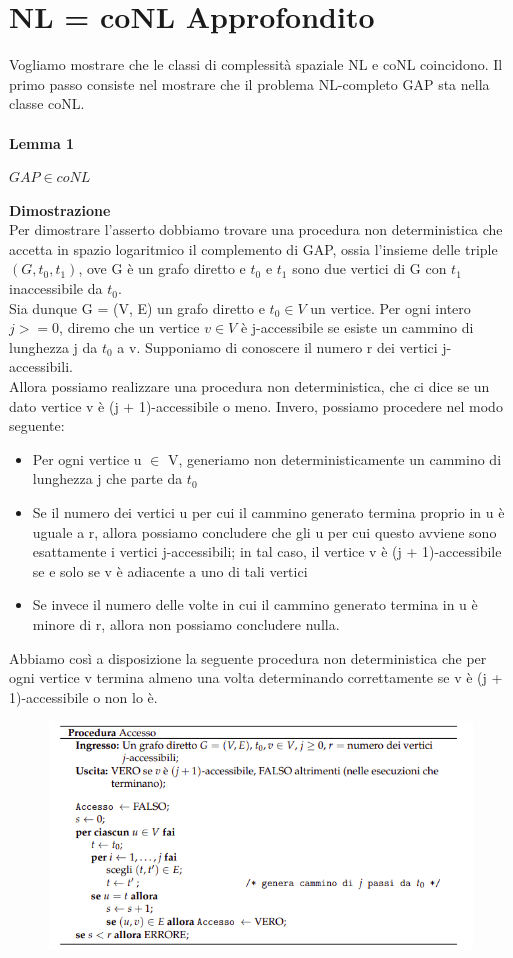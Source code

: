 \section{NL = coNL Approfondito}
Vogliamo mostrare che le classi di complessità spaziale NL e coNL coincidono. Il primo passo consiste nel mostrare che il problema NL-completo GAP sta nella classe coNL.\\\\
\textbf{Lemma 1}
\begin{center}
    $GAP \in coNL$
\end{center}
\textbf{Dimostrazione}\\
Per dimostrare l’asserto dobbiamo trovare una procedura non deterministica che accetta in spazio logaritmico il complemento di GAP, ossia l’insieme delle triple $(G, t_0, t_1)$, ove G è un grafo diretto e $t_0$ e $t_1$ sono due vertici di G con $t_1$ inaccessibile da $t_0$.
\\Sia dunque G = (V, E) un grafo diretto e $t_0 \in V$ un vertice. Per ogni intero $j >= 0$, diremo che un vertice $v \in V$ è j-accessibile se esiste un cammino di lunghezza j da $t_0$ a v. Supponiamo di conoscere il numero r dei vertici j-accessibili.
\\ Allora possiamo realizzare una procedura non deterministica, che ci dice se un dato vertice v è (j + 1)-accessibile o meno. Invero, possiamo procedere nel modo seguente:
\begin{itemize}
    \item Per ogni vertice u $\in$ V, generiamo non deterministicamente un cammino di lunghezza j che parte da $t_0$ 
    \item Se il numero dei vertici u per cui il cammino generato termina proprio in u è uguale a r, allora possiamo concludere che gli u per cui questo avviene sono esattamente i vertici j-accessibili; in tal caso, il vertice v è (j + 1)-accessibile se e solo se v è adiacente a uno di tali vertici
    \item Se invece il numero delle volte in cui il cammino generato termina in u è minore di r, allora non possiamo concludere nulla.
\end{itemize}
Abbiamo così a disposizione la seguente procedura non deterministica che per ogni vertice v termina almeno una volta determinando correttamente se v è (j + 1)-accessibile o non lo è.
\begin{figure}[htp]
    \centering
    \includegraphics[scale=0.6]{tesi_stile/img/nl1.png}
\end{figure}
